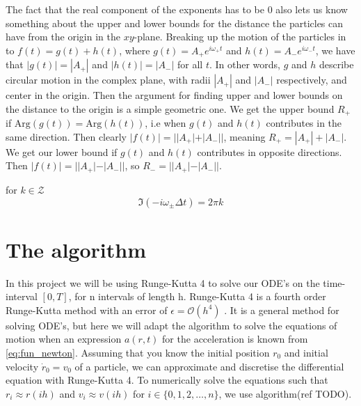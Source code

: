 The fact that the real component of the exponents has to be $0$ also lets us know something about the upper and lower bounds for the distance the particles can have from the origin in the $xy$-plane. Breaking up the motion of the particles in to $f(t) = g(t) + h(t)$, where $g(t) = A_+e^{i\omega_+ t}$ and $h(t) = A_-e^{i\omega_- t}$, we have that $|g(t)| = |A_+|$ and $|h(t)| = |A_-|$ for all $t$. In other words, $g$ and $h$ describe circular motion in the complex plane, with radii $|A_+|$ and $|A_-|$ respectively, and center in the origin. Then the argument for finding upper and lower bounds on the distance to the origin is a simple geometric one. We get the upper bound $R_+$ if $\text{Arg}(g(t)) = \text{Arg}(h(t))$, i.e when $g(t)$ and $h(t)$ contributes in the same direction. Then clearly $|f(t)| = ||A_+| + |A_-||$, meaning $R_+ = |A_+| + |A_-|$. We get our lower bound if $g(t)$ and $h(t)$ contributes in opposite directions. Then $|f(t)| = ||A_+| - |A_-||$, so $R_- = ||A_+| - |A_-||$. %


for $k \in \mathcal{Z}$
$$\Im(-i \omega_\pm \Delta t) = 2 \pi k$$

\section*{The algorithm}
In this project we will be using Runge-Kutta 4 to solve our ODE's on the time-interval $[0, T]$, for n intervals of length h. Runge-Kutta 4 is a fourth order Runge-Kutta method with an error of $\epsilon = \mathcal{O}(h^4)$ . It is a general method for solving ODE's, but here we will adapt the algorithm to solve the equations of motion when an expression $a(r, t)$ for the acceleration is known from \ref{eq:fun_newton}. Assuming that you know the initial position $r_0$ and initial velocity $\dot{r}_0=v_0$ of a particle, we can approximate and discretise the differential equation with Runge-Kutta 4. To numerically solve the equations such that $r_i \approx r(ih)$ and $v_i \approx v(ih)$ for $i \in \{0, 1, 2, \ldots, n\}$, we use algorithm(ref TODO).

